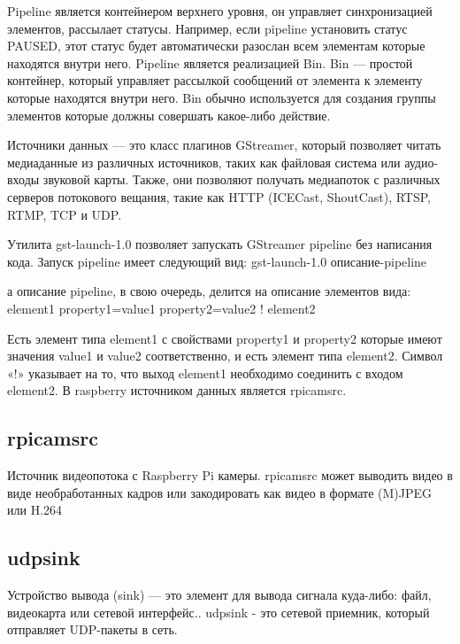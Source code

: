 Pipeline является контейнером верхнего уровня, он управляет синхронизацией элементов, рассылает статусы. Например, если pipeline установить статус PAUSED, этот статус будет автоматически разослан всем элементам которые находятся внутри него. Pipeline является реализацией Bin.
Bin — простой контейнер, который управляет рассылкой сообщений от элемента к элементу которые находятся внутри него. Bin обычно используется для создания группы элементов которые должны совершать какое-либо действие. 

Источники данных — это класс плагинов GStreamer, который позволяет читать медиаданные из различных источников, таких как файловая система или аудио-входы звуковой карты. Также, они позволяют получать медиапоток с различных серверов потокового вещания, такие как HTTP (ICECast, ShoutCast), RTSP, RTMP, TCP и UDP. 

Утилита gst-launch-1.0 позволяет запускать GStreamer pipeline без написания кода. Запуск pipeline имеет следующий вид:
gst-launch-1.0 описание-pipeline

а описание pipeline, в свою очередь, делится на описание элементов вида:
element1 property1=value1 property2=value2 ! element2 

Есть элемент типа element1 с свойствами property1 и property2 которые имеют значения value1 и value2 соответственно, и есть элемент типа element2. Символ «!» указывает на то, что выход element1 необходимо соединить с входом element2.
В raspberry источником данных является rpicamsrc.

\subsection{rpicamsrc}

Источник видеопотока с Raspberry Pi камеры. rpicamsrc может выводить видео в виде необработанных кадров или закодировать как видео в формате (M)JPEG или H.264 
\subsection{udpsink}
Устройство вывода (sink) — это элемент для вывода сигнала куда-либо:  файл, видеокарта или сетевой интерфейс.. 
udpsink - это сетевой приемник, который отправляет UDP-пакеты в сеть.


